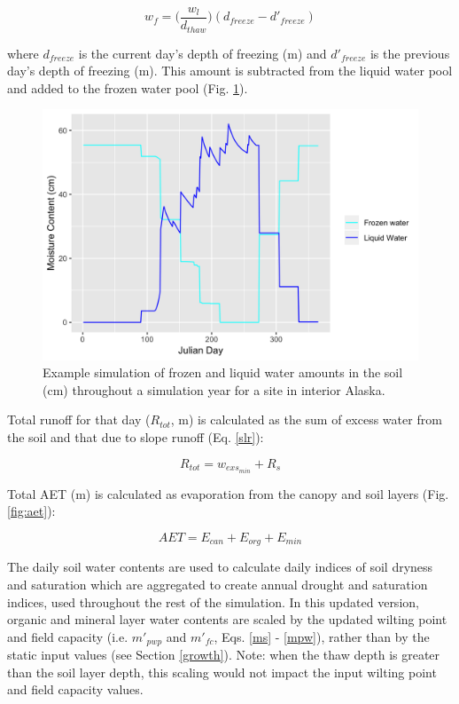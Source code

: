 \documentclass[a4paper, 12pt] {report}
\begin{document}
\begin{equation}
w_f= \Big(\frac{w_l}{d_{thaw}}\Big)(d_{freeze} - d'_{freeze})
\end{equation}

where $d_{freeze}$ is the current day's depth of freezing (m) and $d'_{freeze}$ is the previous day's depth of freezing (m). This amount is subtracted from the liquid water pool and added to the frozen water pool (Fig. \ref{fig:icewater}).

\begin{figure}
  \includegraphics[width=0.8\linewidth]{Figures/Ice.png}
  \caption{Example simulation of frozen and liquid water amounts in the soil (cm) throughout a simulation year for a site in interior Alaska.}
  \label{fig:icewater}
\end{figure}

Total runoff for that day ($R_{tot}$, m) is calculated as the sum of excess water from the soil and that due to slope runoff (Eq. \ref{slr}):

\begin{equation}
R_{tot} = w_{exs_{min}} + R_s
\end{equation}

Total AET (m) is calculated as evaporation from the canopy and soil layers (Fig. \ref{fig:aet}):

\begin{equation}
AET = E_{can} + E_{org} + E_{min}
\end{equation}

The daily soil water contents are used to calculate daily indices of soil dryness and saturation which are aggregated to create annual drought and saturation indices, used throughout the rest of the simulation. In this updated version, organic and mineral layer water contents are scaled by the updated wilting point and field capacity (i.e. $m'_{pwp}$ and $m'_{fc}$, Eqs. \ref{ms} - \ref{mpw}), rather than by the static input values (see Section \ref{growth}). Note: when the thaw depth is greater than the soil layer depth, this scaling would not impact the input wilting point and field capacity values.
\end{document}
